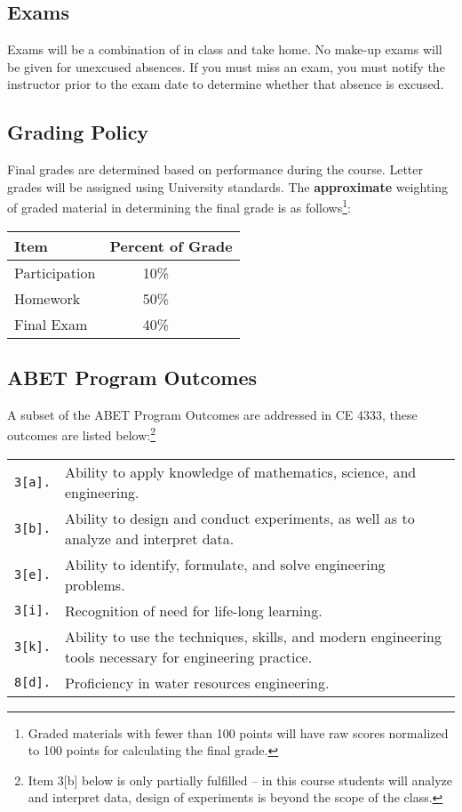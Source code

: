 \documentclass[12pt]{article}
\begin{document}
\subsection*{Exams}
Exams will be a combination of in class and take home. No make-up exams will be given for unexcused absences. If you must miss an exam, you must notify the instructor prior to the exam date to determine whether that absence is excused.
\subsection*{Grading Policy}
Final grades are determined based on performance during the course.
Letter grades will be assigned using University standards.  
The \textbf{approximate} weighting of graded material in determining the final grade is as follows\footnote{Graded materials with fewer than 100 points will have raw scores normalized to 100 points for calculating the final grade.}:

\begin{table}[h!]
   \centering
   \begin{tabular}{l l}
Item & Percent of Grade \\
\hline
\hline
Participation  & ~~~~ 10\% \\
Homework   &  ~~~~ 50\% \\
Final Exam  &  ~~~~ 40\% \\
\hline
\end{tabular}
\end{table}
\subsection*{ABET Program Outcomes}
A subset of the ABET Program Outcomes are addressed in CE 4333, these outcomes are listed below:\footnote{Item 3[b] below is only partially fulfilled -- in this course students will analyze and interpret data, design of experiments is beyond the scope of the class.}

\begin{tabular}{p{0.5in}p{5.5in}}
\texttt{3[a].}  & Ability to apply knowledge of mathematics, science, and engineering.\\
\texttt{3[b].}  & Ability to design and conduct experiments, as well as to analyze and interpret data.\\
\texttt{3[e].}  & Ability to identify, formulate, and solve engineering problems.\\
\texttt{3[i].}   & Recognition of need for life-long learning.\\
\texttt{3[k].}  & Ability to use the techniques, skills, and modern engineering tools necessary for engineering practice.\\
\texttt{8[d].}  & Proficiency in water resources engineering.\\
\end{tabular}
\end{document}
